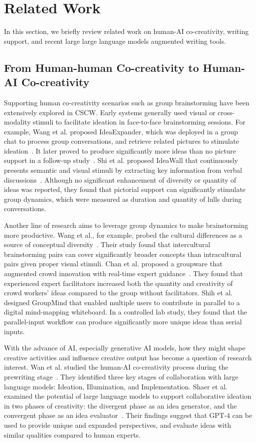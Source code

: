 \section{Related Work}
In this section, we briefly review related work on human-AI co-creativity, writing support, and recent large large language models augmented writing tools.

\subsection{From Human-human Co-creativity to Human-AI Co-creativity}
Supporting human co-creativity scenarios such as group brainstorming have been extensively explored in CSCW. Early systems generally used visual or cross-modality stimuli to facilitate ideation in face-to-face brainstorming sessions. For example, Wang et al. proposed IdeaExpander, which was deployed in a group chat to process group conversations, and retrieve related pictures to stimulate ideation~\cite{wang2010idea}. It later proved to produce significantly more ideas than no picture support in a follow-up study~\cite{wang2011diversity}. Shi et al. proposed IdeaWall that continuously presents semantic and visual stimuli by extracting key information from verbal discussions~\cite{shi2017ideawall}. Although no significant enhancement of diversity or quantity of ideas was reported, they found that pictorial support can significantly stimulate group dynamics, which were measured as duration and quantity of lulls during conversations.

Another line of research aims to leverage group dynamics to make brainstorming more productive. Wang et al., for example, probed the cultural differences as a source of conceptual diversity~\cite{wang2011diversity}. Their study found that intercultural brainstorming pairs can cover significantly broader concepts than intracultural pairs given proper visual stimuli. Chan et al. proposed a groupware that augmented crowd innovation with real-time expert guidance~\cite{chan2016improving}. They found that experienced expert facilitators increased both the quantity and creativity of crowd workers' ideas compared to the group without facilitators. Shih et al.~\cite{shih2009groupmind} designed GroupMind that enabled multiple users to contribute in parallel to a digital mind-mapping whiteboard. In a controlled lab study, they found that the parallel-input workflow can produce significantly more unique ideas than serial inputs.

With the advance of AI, especially generative AI models, how they might shape creative activities and influence creative output has become a question of research interest. Wan et al. studied the human-AI co-creativity process during the prewriting stage~\cite{wan2024felt}. They identified three key stages of collaboration with large language models: Ideation, Illumination, and Implementation. Shaer et al. examined the potential of large language models to support collaborative ideation in two phases of creativity: the divergent phase as an idea generator, and the convergent phase as an idea evaluator~\cite{shaer2024ai}. Their findings suggest that GPT-4 can be used to provide unique and expanded perspectives, and evaluate ideas with similar qualities compared to human experts.

